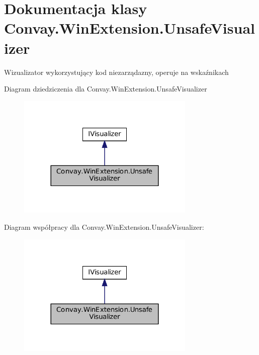 \hypertarget{class_convay_1_1_win_extension_1_1_unsafe_visualizer}{}\section{Dokumentacja klasy Convay.\+Win\+Extension.\+Unsafe\+Visualizer}
\label{class_convay_1_1_win_extension_1_1_unsafe_visualizer}


Wizualizator wykorzystujący kod niezarządazny, operuje na wskaźnikach  




Diagram dziedziczenia dla Convay.\+Win\+Extension.\+Unsafe\+Visualizer
\nopagebreak
\begin{figure}[H]
\begin{center}
\leavevmode
\includegraphics[width=240pt]{class_convay_1_1_win_extension_1_1_unsafe_visualizer__inherit__graph}
\end{center}
\end{figure}


Diagram współpracy dla Convay.\+Win\+Extension.\+Unsafe\+Visualizer\+:
\nopagebreak
\begin{figure}[H]
\begin{center}
\leavevmode
\includegraphics[width=240pt]{class_convay_1_1_win_extension_1_1_unsafe_visualizer__coll__graph}
\end{center}
\end{figure}
